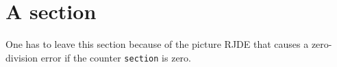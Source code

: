 

\section{A section}

One has to leave this section because of the picture RJDE that causes a zero-division error if the counter \texttt{section} is zero.



